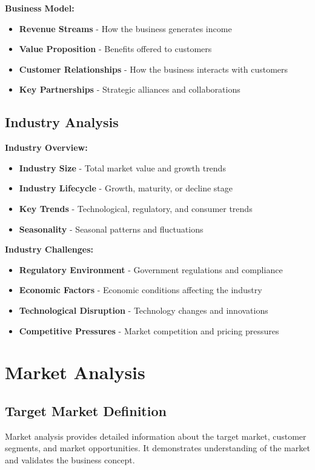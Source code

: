 \documentclass[12pt]{article}
\begin{document}
\textbf{Business Model:}
\begin{itemize}
    \item \textbf{Revenue Streams} - How the business generates income
    \item \textbf{Value Proposition} - Benefits offered to customers
    \item \textbf{Customer Relationships} - How the business interacts with customers
    \item \textbf{Key Partnerships} - Strategic alliances and collaborations
\end{itemize}

\subsection{Industry Analysis}

\textbf{Industry Overview:}
\begin{itemize}
    \item \textbf{Industry Size} - Total market value and growth trends
    \item \textbf{Industry Lifecycle} - Growth, maturity, or decline stage
    \item \textbf{Key Trends} - Technological, regulatory, and consumer trends
    \item \textbf{Seasonality} - Seasonal patterns and fluctuations
\end{itemize}

\textbf{Industry Challenges:}
\begin{itemize}
    \item \textbf{Regulatory Environment} - Government regulations and compliance
    \item \textbf{Economic Factors} - Economic conditions affecting the industry
    \item \textbf{Technological Disruption} - Technology changes and innovations
    \item \textbf{Competitive Pressures} - Market competition and pricing pressures
\end{itemize}

\section{Market Analysis}

\subsection{Target Market Definition}
Market analysis provides detailed information about the target market, customer segments, and market opportunities. It demonstrates understanding of the market and validates the business concept.
\end{document}
